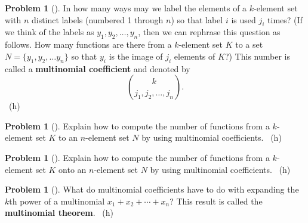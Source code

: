 \documentclass[10pt,]{book}
\newcommand{\terminology}[1]{\textbf{#1}}
\theoremstyle{plain}
\theoremstyle{definition}
\newtheorem{activity}[project]{Problem}
\theoremstyle{definition}
\numberwithin{equation}{chapter}
\begin{document}
\begin{activity}[] \label{activity-148}
\hypertarget{p-841}{}%
In how many ways may we label the elements of a \(k\)-element set with \(n\) distinct labels (numbered 1 through \(n\)) so that label \(i\) is used \(j_i\) times? (If we think of the labels as \(y_1, y_2, \ldots, y_n\), then we can rephrase this question as follows.  How many functions are there from a \(k\)-element set \(K\) to a set \(N=\{y_1,y_2,\ldots y_n\}\) so that \(y_i\) is the image of \(j_i\) elements of \(K\)?) This number is called a \terminology{multinomial coefficient} and denoted by%
\begin{equation*}
\binom{k}{j_1,j_2,\ldots, j_n}.
\end{equation*}
%
~{\tiny (h)}\end{activity}
\begin{activity}[]\marginsymbol[-1em]{} \label{activity-149}
\hypertarget{p-845}{}%
Explain how to compute the number of functions from a \(k\)-element set \(K\) to an \(n\)-element set \(N\) by using multinomial coefficients.%
~{\tiny (h)}\end{activity}
\begin{activity}[]\marginsymbol[-1em]{} \label{activity-150}
\hypertarget{p-848}{}%
Explain how to compute the number of functions from a \(k\)-element set \(K\) onto an \(n\)-element set \(N\) by using multinomial coefficients.%
~{\tiny (h)}\end{activity}
\begin{activity}[] \label{activity-151}
\hypertarget{p-851}{}%
What do multinomial coefficients have to do with expanding the \(k\)th power of a multinomial \(x_1+x_2+\cdots+x_n\)? This result is called the \terminology{multinomial theorem}.%
~{\tiny (h)}\end{activity}
\typeout{************************************************}
\typeout{************************************************}
\end{document}
